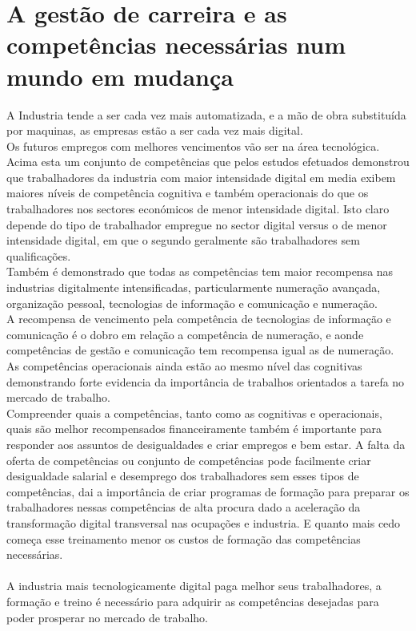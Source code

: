 \section{A gestão de carreira e as competências necessárias num mundo em mudança}
\qquad A Industria tende a ser cada vez mais automatizada, e a mão de obra substituída por maquinas, as empresas estão a ser cada vez mais digital.\\
Os futuros empregos com melhores vencimentos vão ser na área tecnológica.\\

Acima esta um conjunto de competências que pelos estudos efetuados demonstrou que trabalhadores da industria com maior intensidade digital em media exibem maiores níveis de competência cognitiva e também operacionais do que os trabalhadores nos sectores económicos de menor intensidade digital. Isto claro depende do tipo de trabalhador empregue no sector digital versus o de menor intensidade digital, em que o segundo geralmente são trabalhadores sem qualificações.\cite{article_1}\\
Também é demonstrado que todas as competências tem maior recompensa nas industrias digitalmente intensificadas, particularmente numeração avançada, organização pessoal, tecnologias de informação e comunicação e numeração.\cite{article_1}\\
A recompensa de vencimento pela competência de tecnologias de informação e comunicação é o dobro em relação a competência de numeração, e aonde competências de gestão e comunicação tem recompensa igual as de numeração.\cite{article_1}\\
As competências operacionais ainda estão ao mesmo nível das cognitivas demonstrando forte evidencia da importância de trabalhos orientados a tarefa no mercado de trabalho.\cite{article_1}\\
Compreender quais a competências, tanto como as cognitivas e operacionais, quais são melhor recompensados financeiramente também é importante para responder aos assuntos de  desigualdades e criar empregos e bem estar. A falta da oferta de competências ou conjunto de competências pode facilmente criar desigualdade salarial e desemprego dos trabalhadores sem esses tipos de competências, dai a importância de criar programas de formação para preparar os trabalhadores nessas competências de alta procura dado a aceleração da transformação digital transversal nas ocupações e industria. E quanto mais cedo começa esse treinamento menor os custos de formação das competências necessárias.\cite{article_1}\\
\\
A industria mais tecnologicamente digital paga melhor seus trabalhadores, a formação e treino é necessário para adquirir as competências desejadas para poder prosperar no mercado de trabalho.
